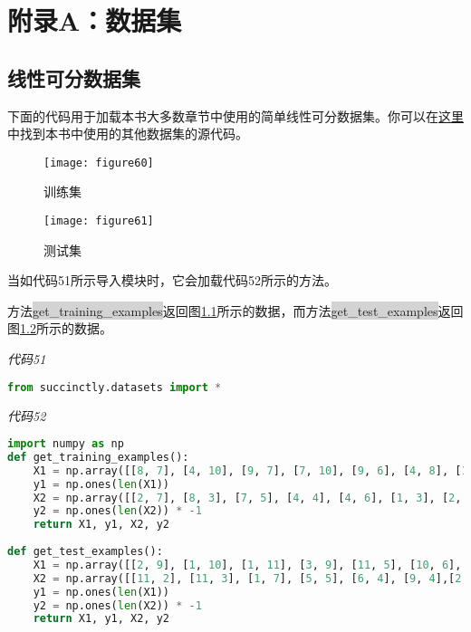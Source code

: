 \chapter{附录A：数据集}

\section{线性可分数据集}

下面的代码用于加载本书大多数章节中使用的简单线性可分数据集。你可以在\href{https://bitbucket.org/syncfusiontech/svm-succinctly}{这里}中找到本书中使用的其他数据集的源代码。

\begin{figure}[ht]
	\centering
	\texttt{[image: figure60]}
	\caption{训练集}
	\label{figure60}
\end{figure}

\begin{figure}[ht]
	\centering
	\texttt{[image: figure61]}
	\caption{测试集}
	\label{figure61}
\end{figure}

当如代码51所示导入模块时，它会加载代码52所示的方法。

方法\colorbox{lightgray}{get\_training\_examples}返回图\ref{figure60}所示的数据，而方法\colorbox{lightgray}{get\_test\_examples}返回图\ref{figure61}所示的数据。

\emph{代码51}

\begin{lstlisting}[language=python]
from succinctly.datasets import *
\end{lstlisting}

\emph{代码52}

\begin{lstlisting}[language=python]
import numpy as np 
def get_training_examples(): 
    X1 = np.array([[8, 7], [4, 10], [9, 7], [7, 10], [9, 6], [4, 8], [10, 10]])
    y1 = np.ones(len(X1)) 
    X2 = np.array([[2, 7], [8, 3], [7, 5], [4, 4], [4, 6], [1, 3], [2, 5]]) 
    y2 = np.ones(len(X2)) * -1 
    return X1, y1, X2, y2 
    
def get_test_examples(): 
    X1 = np.array([[2, 9], [1, 10], [1, 11], [3, 9], [11, 5], [10, 6], [10, 11], [7, 8], [8, 8], [4, 11], [9, 9], [7, 7], [11, 7], [5, 8], [6, 10]]) 
    X2 = np.array([[11, 2], [11, 3], [1, 7], [5, 5], [6, 4], [9, 4],[2, 6], [9, 3], [7, 4], [7, 2], [4, 5], [3, 6], [1, 6], [2, 3], [1, 1], [4, 2], [4, 3]])
    y1 = np.ones(len(X1)) 
    y2 = np.ones(len(X2)) * -1 
    return X1, y1, X2, y2

\end{lstlisting}

